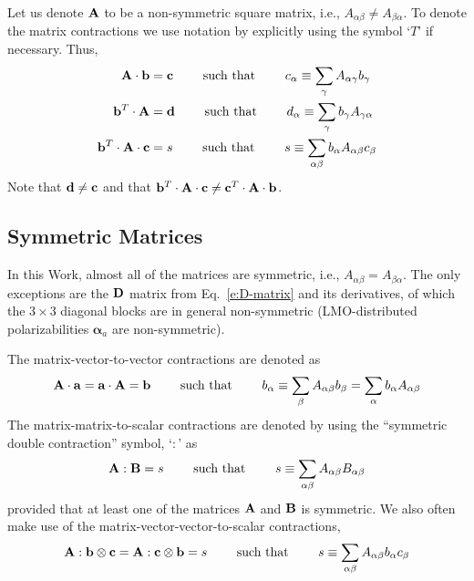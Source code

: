 \documentclass[b5paper,oneside,fleqn,11pt]{book}
\newcommand{\BM}[1]{\bm{#1}}
\begin{document}
\begin{appendices}
Let us denote ${\bf A}$ to be a non-symmetric square matrix, i.e., 
$A_{\alpha\beta}\ne A_{\beta\alpha}$. To denote the matrix contractions
we use notation by explicitly using the symbol `$T$' if necessary.
Thus,
%
\begin{subequations}
\begin{align}
 {\bf A} \cdot {\bf b} &= {\bf c}
 \qquad\text{ such that } 
 \qquad c_{\alpha}  \equiv \sum_\gamma A_{\alpha\gamma} b_{\gamma} 
%
\\
{\bf b}^T \cdot {\bf A}   &= {\bf d}
 \qquad\text{ such that } 
 \qquad d_{\alpha}  \equiv \sum_\gamma b_{\gamma} A_{\gamma\alpha}
%
\\
{\bf b}^T \cdot {\bf A} \cdot {\bf c}  &= s
 \qquad\text{ such that } 
 \qquad s \equiv \sum_{\alpha\beta} b_{\alpha} A_{\alpha\beta} c_{\beta}
\end{align}
\end{subequations}
%
Note that ${\bf d} \ne {\bf c}$ and that 
${\bf b}^T \cdot {\bf A} \cdot {\bf c} \ne {\bf c}^T \cdot {\bf A} \cdot {\bf b}$.

\subsection{Symmetric Matrices}

In this Work, almost all of the matrices are symmetric, i.e., 
$A_{\alpha\beta}= A_{\beta\alpha}$. The only exceptions
are the ${\bf D}$ matrix from Eq.~\eqref{e:D-matrix} 
and its derivatives, of which the $3\times 3$ diagonal blocks
are in general non-symmetric (LMO\hyp{}distributed polarizabilities ${\BM \alpha}_a$
are non\hyp{}symmetric). 

The matrix\hyp{}vector\hyp{}to\hyp{}vector contractions are denoted as
%
\begin{equation}
 {\bf A} \cdot {\bf a} = {\bf a} \cdot {\bf A} = {\bf b} 
 \qquad\text{ such that } 
 \qquad b_\alpha \equiv \sum_{\beta} A_{\alpha\beta} b_{\beta} = \sum_{\alpha} b_{\alpha} A_{\alpha\beta} 
\end{equation}
%
The matrix\hyp{}matrix\hyp{}to\hyp{}scalar 
contractions are denoted
by using the ``symmetric double contraction''
symbol, `$:$' as
%
\begin{equation}
 {\bf A} : {\bf B} = s \qquad\text{ such that } 
                                   \qquad s \equiv \sum_{\alpha\beta} A_{\alpha\beta} B_{\alpha\beta}
\end{equation}
%
provided that at least one of the matrices ${\bf A}$ and ${\bf B}$ is symmetric.
We also often make use of the matrix\hyp{}vector\hyp{}vector\hyp{}to\hyp{}scalar contractions,
%
\begin{equation}
 {\bf A} : {\bf b} \otimes {\bf c} = {\bf A} : {\bf c} \otimes {\bf b} = s
 \qquad\text{ such that } 
 \qquad s \equiv \sum_{\alpha\beta} A_{\alpha\beta} b_{\alpha} c_{\beta}
\end{equation}
%


\end{appendices}
\end{document}
